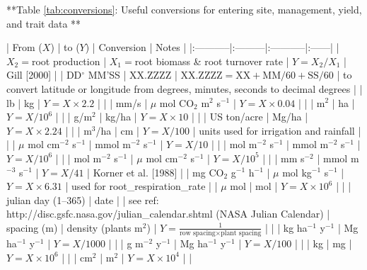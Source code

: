 **Table \ref{tab:conversions}: Useful conversions for entering site, management, yield, and trait data \label{tab:conversions}**

| From ($X$) | to ($Y$) | Conversion | Notes |
|:-----------|:---------|:-----------|:------|
| $X_2=$root production | $X_1=$root biomass & root turnover rate | $Y = X_2/X_1$ | Gill [2000] |
| DD$^{\circ}$ MM'SS | XX.ZZZZ | $\textrm{XX.ZZZZ} = \textrm{XX} + \textrm{MM}/60+\textrm{SS}/60$ | to convert latitude or longitude from degrees, minutes, seconds to  decimal degrees |
| lb | kg | $Y=X\times 2.2$ | |
| mm/s | $\mu$ mol CO$_2$ m$^{2}$ s$^{-1}$ | $Y=X\times 0.04$ | |
| m$^2$ | ha | $Y = X/10^6$ | |
| g/m$^2$ | kg/ha | $Y=X\times 10$ | |
| US ton/acre | Mg/ha | $Y = X\times 2.24$ | |
| m$^3$/ha | cm | $Y=X/100$ | units used for irrigation and rainfall |
| %
| $\mu$ mol cm$^{-2}$ s$^{-1}$ | mmol m$^{-2}$ s$^{-1}$ | $Y = X/10$ | |
| mol m$^{-2}$ s$^{-1}$ | mmol m$^{-2}$ s$^{-1}$ | $Y = X/10^6$ | |
| mol  m$^{-2}$ s$^{-1}$ | $\mu$ mol cm$^{-2}$ s$^{-1}$ | $Y = X/ 10^5$ | |
| mm s$^{-2}$ | mmol m$^{-3}$ s$^{-1}$ | $Y=X/41$ | Korner et al. [1988] |
| mg CO$_2$ g$^{-1}$ h$^{-1}$ | $\mu$ mol kg$^{-1}$ s$^{-1}$ | $Y = X\times 6.31$ | used for root_respiration_rate |
| $\mu$ mol | mol | $Y= X\times 10^6$ | |
| julian day (1--365) | date | | see ref: http://disc.gsfc.nasa.gov/julian_calendar.shtml (NASA Julian Calendar)
| spacing (m) | density (plants m$^{2}$) | $Y=\frac{1}{\textrm{row spacing}\times\textrm{plant spacing}}$  | |
| kg ha$^{-1}$ y$^{-1}$ | Mg ha$^{-1}$ y$^{-1}$ | $Y= X/1000$ | |
| g m$^{-2}$ y$^{-1}$ | Mg ha$^{-1}$ y$^{-1}$  | $Y= X/100$ | |
| kg | mg | $Y=X\times 10^6$ | |
| cm$^2$  | m$^2$ | $Y=X\times 10^4$  | |